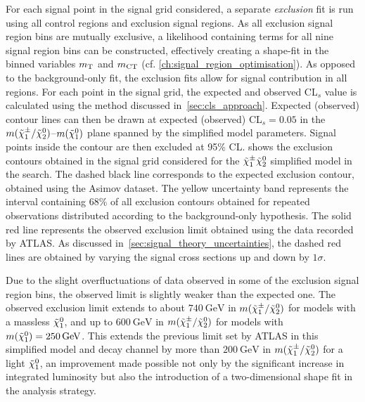 For each signal point in the signal grid considered, a separate \textit{exclusion} fit is run using all control regions and exclusion signal regions. As all exclusion signal region bins are mutually exclusive, a likelihood containing terms for all nine signal region bins can be constructed, effectively creating a shape-fit in the binned variables $m_{\textrm{T}}$ and $m_{\textrm{CT}}$ (cf. \cref{ch:signal_region_optimisation}). As opposed to the background-only fit, the exclusion fits allow for signal contribution in all regions.
For each point in the signal grid, the expected and observed CL$_s$ value is calculated using the method discussed in~\cref{sec:cls_approach}. Expected (observed) contour lines can then be drawn at expected (observed) CL$_s =0.05$ in the $m(\tilde{\chi}_1^\pm/\tilde{\chi}_2^0)$--$m(\tilde{\chi}_1^0)$ plane spanned by the simplified model parameters. Signal points inside the contour are then excluded at 95\% CL. 
 shows the exclusion contours obtained in the signal grid considered for the $\tilde{\chi}_1^\pm\tilde{\chi}_2^0$ simplified model in the \onelepton search. The dashed black line corresponds to the expected exclusion contour, obtained using the Asimov dataset. The yellow uncertainty band represents the interval containing 68\% of all exclusion contours obtained for repeated observations distributed according to the background-only hypothesis. 
The solid red line represents the observed exclusion limit obtained using the data recorded by ATLAS. As discussed in~\cref{sec:signal_theory_uncertainties}, the dashed red lines are obtained by varying the signal cross sections up and down by $1\sigma$.

Due to the slight overfluctuations of data observed in some of the exclusion signal region bins, the observed limit is slightly weaker than the expected one. The observed exclusion limit extends to about $\SI{740}{\GeV}$ in $m(\tilde{\chi}_1^\pm/\tilde{\chi}_2^0)$ for models with a massless $\tilde{\chi}_1^0$, and up to $\SI{600}{\GeV}$ in $m(\tilde{\chi}_1^\pm/\tilde{\chi}_2^0)$ for models with $m(\lsp)=\SI{250}{\GeV}$. This extends the previous limit set by ATLAS in this simplified model and decay channel by more than $\SI{200}{\GeV}$ in $m(\tilde{\chi}_1^\pm/\tilde{\chi}_2^0)$ for a light $\tilde{\chi}_1^0$, an improvement made possible not only by the significant increase in integrated luminosity but also the introduction of a two-dimensional shape fit in the analysis strategy. 

